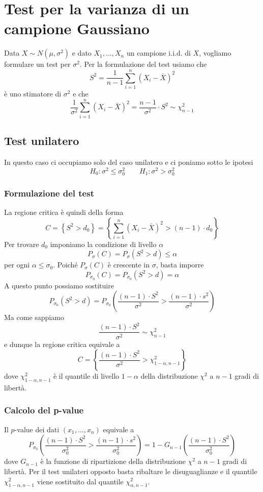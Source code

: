 \section{Test per la varianza di un campione Gaussiano}
Data $X \sim N(\mu, \sigma^2)$ e dato $X_1, \dots, X_n$ un campione i.i.d. di $X$, vogliamo
formulare un test per $\sigma^2$. Per la formulazione del test usiamo che
\[ S^2 = \frac{1}{n-1} \sum_{i=1}^n (X_i - \bar{X})^2 \]
è uno stimatore di $\sigma^2$ e che
\[
	\frac{1}{\sigma^2} \sum_{i=1}^n (X_i - \bar{X})^2 =
	\frac{n-1}{\sigma^2} \cdot S^2 \sim \chi_{n-1}^2
\]

\subsection{Test unilatero}
In questo caso ci occupiamo solo del caso unilatero e ci poniamo sotto le ipotesi
\[ H_0 : \sigma^2 \leq \sigma_0^2 \qquad H_1 : \sigma^2 > \sigma_0^2 \]

\subsubsection{Formulazione del test}
La regione critica è quindi della forma
\[
	C = \left\{ S^2 > d_0 \right\} =
	\left\{ \sum_{i=1}^n (X_i - \bar{X})^2 > (n-1) \cdot d_0 \right\}
\]
Per trovare $d_0$ imponiamo la condizione di livello $\alpha$
\[ P_\sigma (C) = P_\sigma (S^2 > d) \leq \alpha \]
per ogni $\alpha \leq \sigma_0$. Poiché $P_\sigma(C)$ è crescente in $\sigma$, basta imporre
\[ P_{\sigma_0} (C) = P_{\sigma_0} (S^2 > d) = \alpha \]
A questo punto possiamo sostituire
\[
	P_{\sigma_0} (S^2 > d) =
	P_{\sigma_0} \left( \frac{(n-1) \cdot S^2}{\sigma^2} > \frac{(n-1) \cdot s^2}{\sigma^2} \right)
\]
Ma come sappiamo
\[ \frac{(n-1) \cdot S^2}{\sigma^2} \sim \chi_{n-1}^2 \]
e dunque la regione critica equivale a
\[ C = \left\{ \frac{(n-1) \cdot S^2}{\sigma^2} > \chi_{1-\alpha, n-1}^2 \right\} \]
dove $\chi_{1-\alpha, n-1}^2$ è il quantile di livello $1-\alpha$ della distribuzione $\chi^2$ a
$n-1$ gradi di libertà.

\subsubsection{Calcolo del p-value}
Il $p$-value dei dati $(x_1, \dots, x_n)$ equivale a
\[
	P_{\sigma_0} \left( \frac{(n-1) \cdot S^2}{\sigma_0^2} >
	\frac{(n-1) \cdot s^2}{\sigma_0^2} \right) =
	1 - G_{n-1} \left( \frac{(n-1) \cdot S^2}{\sigma_0^2} \right)
\]
dove $G_{n-1}$ è la funzione di ripartizione della distribuzione $\chi^2$ a $n-1$ gradi di libertà.
Per il test unilateri opposto basta ribaltare le disuguaglianze e il quantile
$\chi_{1-\alpha, n-1}^2$ viene sostituito dal quantile $\chi_{\alpha, n-1}^2$.